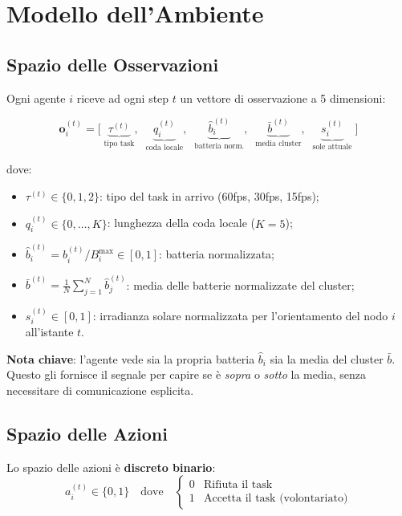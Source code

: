 \documentclass[11pt,a4paper]{article}
\begin{document}
\section{Modello dell'Ambiente}

\subsection{Spazio delle Osservazioni}

Ogni agente $i$ riceve ad ogni step $t$ un vettore di osservazione a 5 dimensioni:

\begin{equation}
\mathbf{o}_i^{(t)} = \Big[\; \underbrace{\tau^{(t)}}_{\text{tipo task}},\;\; \underbrace{q_i^{(t)}}_{\text{coda locale}},\;\; \underbrace{\hat{b}_i^{(t)}}_{\text{batteria norm.}},\;\; \underbrace{\bar{b}^{(t)}}_{\text{media cluster}},\;\; \underbrace{s_i^{(t)}}_{\text{sole attuale}} \;\Big]
\label{eq:obs}
\end{equation}

dove:
\begin{itemize}[nosep]
    \item $\tau^{(t)} \in \{0, 1, 2\}$: tipo del task in arrivo (60fps, 30fps, 15fps);
    \item $q_i^{(t)} \in \{0, \ldots, K\}$: lunghezza della coda locale ($K=5$);
    \item $\hat{b}_i^{(t)} = b_i^{(t)} / B_i^{\max} \in [0, 1]$: batteria normalizzata;
    \item $\bar{b}^{(t)} = \frac{1}{N}\sum_{j=1}^{N} \hat{b}_j^{(t)}$: media delle batterie normalizzate del cluster;
    \item $s_i^{(t)} \in [0, 1]$: irradianza solare normalizzata per l'orientamento del nodo $i$ all'istante $t$.
\end{itemize}

\textbf{Nota chiave}: l'agente vede sia la propria batteria $\hat{b}_i$ sia la media del cluster $\bar{b}$. Questo gli fornisce il segnale per capire se \`e \emph{sopra} o \emph{sotto} la media, senza necessitare di comunicazione esplicita.

\subsection{Spazio delle Azioni}

Lo spazio delle azioni \`e \textbf{discreto binario}:
\begin{equation}
a_i^{(t)} \in \{0, 1\} \quad \text{dove} \quad
\begin{cases}
0 & \text{Rifiuta il task} \\
1 & \text{Accetta il task (volontariato)}
\end{cases}
\end{equation}
\end{document}
